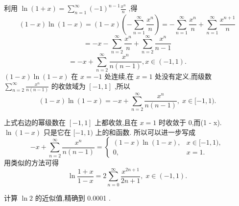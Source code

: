 \begin{solution}

\end{solution}
利用 \(\ln \left( {1 + x}\right)  = \mathop{\sum }\limits_{{n = 1}}^{\infty }{\left( -1\right) }^{n - 1}\frac{{x}^{n}}{n}\) ,得
\[
\left( {1 - x}\right) \ln \left( {1 - x}\right)  = \left( {1 - x}\right) \left( {-\mathop{\sum }\limits_{{n = 1}}^{\infty }\frac{{x}^{n}}{n}}\right)  =  - \mathop{\sum }\limits_{{n = 1}}^{\infty }\frac{{x}^{n}}{n} + \mathop{\sum }\limits_{{n = 1}}^{\infty }\frac{{x}^{n + 1}}{n}
\]
\[
=  - x - \mathop{\sum }\limits_{{n = 2}}^{\infty }\frac{{x}^{n}}{n} + \mathop{\sum }\limits_{{n = 2}}^{\infty }\frac{{x}^{n}}{n - 1}
\]
\[
=  - x + \mathop{\sum }\limits_{{n = 2}}^{\infty }\frac{{x}^{n}}{n\left( {n - 1}\right) },x \in  \left( {-1,1}\right) .
\]
\(\left( {1 - x}\right) \ln \left( {1 - x}\right)\) 在 \(x =  - 1\) 处连续,在 \(x = 1\) 处没有定义,而级数 \(\mathop{\sum }\limits_{{n = 2}}^{\infty }\frac{{x}^{n}}{n\left( {n - 1}\right) }\) 的收敛域为 \(\left\lbrack  {-1,1}\right\rbrack\) ,所以
\[
\left( {1 - x}\right) \ln \left( {1 - x}\right)  =  - x + \mathop{\sum }\limits_{{n = 2}}^{\infty }\frac{{x}^{n}}{n\left( {n - 1}\right) },\;x \in  \lbrack  - 1,1). \tag{0}
\]
\begin{remark}

\end{remark}
上式右边的幂级数在 \(\left\lbrack  {-1,1}\right\rbrack\) 上都收敛,且在 \(x = 1\) 时收敛于 0,而(1 - x). \(\ln \left( {1 - x}\right)\) 只是它在 \(\lbrack  - 1,1)\) 上的和函数. 所以可以进一步写成
\[
- x + \mathop{\sum }\limits_{{n = 2}}^{\infty }\frac{{x}^{n}}{n\left( {n - 1}\right) } = \left\{  \begin{matrix} \left( {1 - x}\right) \ln \left( {1 - x}\right) , & x \in  \lbrack  - 1,1), \\  0, & x = 1. \end{matrix}\right.
\]
用类似的方法可得
\[
\ln \frac{1 + x}{1 - x} = 2\mathop{\sum }\limits_{{n = 0}}^{\infty }\frac{{x}^{{2n} + 1}}{{2n} + 1},\;x \in  \left( {-1,1}\right) . \tag{12}
\]
\begin{example}

\end{example}
计算 \(\ln 2\) 的近似值,精确到 0.0001 .

